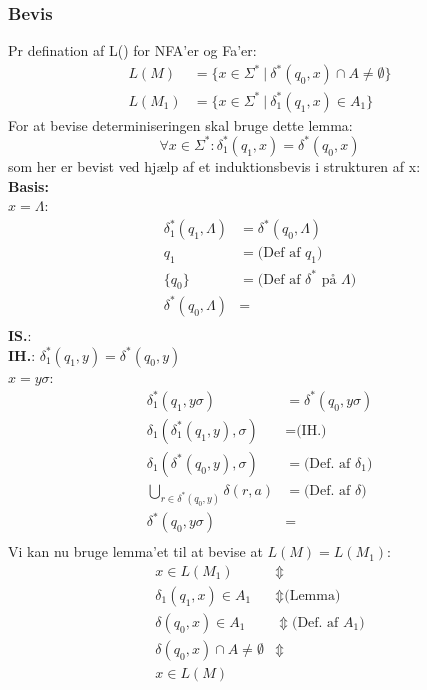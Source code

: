 \documentclass[a4, danish]{article}
\begin{document}
\subsubsection{Bevis}
  Pr defination af L() for NFA'er og Fa'er: 
  \begin{align*}
    L(M)&=\{  x\in \Sigma^* \ | \ \delta^*(q_0,x) \cap A \neq \emptyset \} \\
    L(M_1)&=\{x\in \Sigma ^* \ | \ \delta_1^*(q_1,x)\in A_1 \} 
  \end{align*}
  For at bevise determiniseringen skal bruge dette lemma:
  \begin{equation*}
  \forall x \in \Sigma^*: \delta_1^*(q_1,x) =  \delta^*(q_0,x)
  \end{equation*}
  som her er bevist ved hjælp af et induktionsbevis i strukturen af x: \\
  \textbf{Basis:} \\
  $x=\Lambda$:
  \begin{align*}
    \delta^*_1(q_1,\Lambda) &=  \delta^*(q_0,\Lambda) \\
    q_1 &= \text{(Def af $q_1$)} \\
    \{q_0\} &= \text{(Def af $\delta^*$ på $\Lambda$)} \\
    \delta^*(q_0,\Lambda) &= \\
  \end{align*}
  \textbf{IS.}: \\
  \textbf{IH.}: $\delta_1^*(q_1,y) =  \delta^*(q_0,y)$ \\
  $x=y\sigma$:
  \begin{align*}
    \delta_1^*(q_1,y\sigma)&=\delta^*(q_0,y\sigma) \\
    \delta_1(\delta_1^*(q_1,y),\sigma) &= \text{(IH.)} \\
    \delta_1(\delta^*(q_0,y),\sigma) &= \text{(Def. af $\delta_1$)}\\
    \bigcup_{r\in \delta^*(q_0,y)}\delta(r,a) &= \text{(Def. af $\delta$)}\\
    \delta^*(q_0,y\sigma) &= \\
  \end{align*}
  Vi kan nu bruge lemma'et til at bevise at $L(M)=L(M_1)$:
  \begin{align*}
    x \in L(M_1) &\Updownarrow \\
    \delta_1(q_1,x)\in A_1 &\Updownarrow \text{(Lemma)} \\  
    \delta(q_0,x)\in A_1 &\Updownarrow \text{(Def. af $A_1$)} \\
    \delta(q_0,x)\cap A \neq \emptyset &\Updownarrow \\
    x \in L(M) &
  \end{align*}
\end{document}
